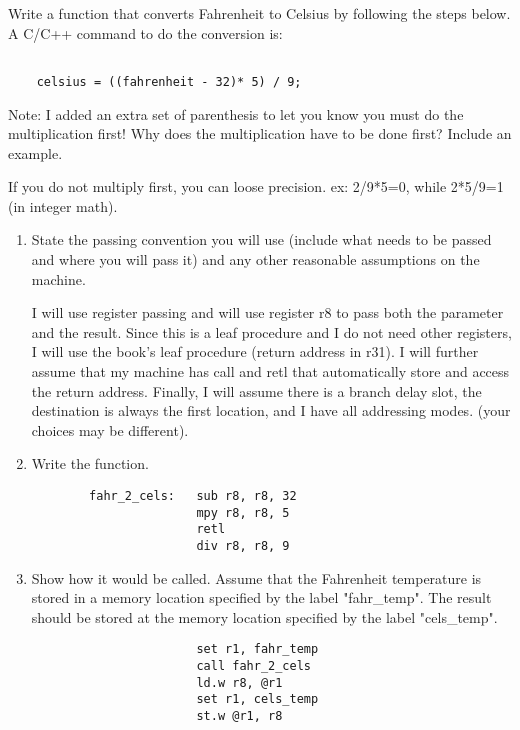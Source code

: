 Write a function that converts Fahrenheit to Celsius by following the steps below.  A C/C++ command to do the conversion is:
    \begin{verbatim}

    celsius = ((fahrenheit - 32)* 5) / 9;
    \end{verbatim}
    Note: I added an extra set of parenthesis to let you know you must do the multiplication first!  Why does the multiplication have to be done first?  Include an example.

    {\color{ans}
        If you do not multiply first, you can loose precision.  ex: 2/9*5=0, while 2*5/9=1 (in integer math).
    }

    \begin{enumerate}
        \item State the passing convention you will use (include what needs to be passed and where you will pass it) and any other reasonable assumptions on the machine.

        {\color{ans}
        I will use register passing and will use register r8 to pass both the parameter and the result.  Since this is a leaf procedure and I do not need other registers, I will use the book's leaf procedure (return address in r31).  I will further assume that my machine has call and retl that automatically store and access the return address.  Finally, I will assume there is a branch delay slot, the destination is always the first location, and I have all addressing modes.  (your choices may be different).
        }

        \item Write the function.

        {\color{ans}
        \begin{verbatim}
        fahr_2_cels:   sub r8, r8, 32
                       mpy r8, r8, 5
                       retl
                       div r8, r8, 9
        \end{verbatim}

        }

        \item Show how it would be called.  Assume that the Fahrenheit temperature is stored in a memory location specified by the label "fahr\_temp".  The result should be stored at the memory location specified by the label "cels\_temp".

        {\color{ans}
        \begin{verbatim}
                       set r1, fahr_temp
                       call fahr_2_cels
                       ld.w r8, @r1
                       set r1, cels_temp
                       st.w @r1, r8
        \end{verbatim}

        }

    \end{enumerate}

